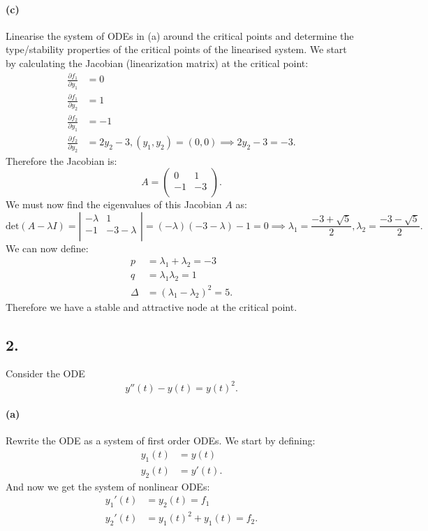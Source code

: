 \paragraph{(c)} Linearise the system of ODEs in (a) around the critical points and determine the type/stability properties of the critical points of the linearised system.
\bigbreak
We start by calculating the Jacobian (linearization matrix) at the critical point:
\begin{align*}
  \frac{\partial f_1}{\partial y_1} &= 0 \\
  \frac{\partial f_1}{\partial y_2} &= 1 \\
  \frac{\partial f_2}{\partial y_1} &= -1 \\
  \frac{\partial f_2}{\partial y_2} &= 2y_2 - 3, \left( y_1, y_2 \right) = \left( 0,0 \right) \implies 2y_2 - 3 = -3
.\end{align*}
Therefore the Jacobian is:
\[ 
A = \begin{pmatrix}
0 & 1\\
-1 & -3\\
\end{pmatrix}
.\]
We must now find the eigenvalues of this Jacobian $A$ as:
\[ 
\mathrm{det}(A - \lambda I) = \left| \begin{array}{cc}
-\lambda & 1\\
-1 & -3 - \lambda\\
\end{array} \right| = \left( -\lambda \right) \left( -3 -\lambda \right) - 1 = 0 \implies \lambda_1 = \frac{-3+\sqrt{5}}{2}, \lambda_2 = \frac{-3-\sqrt{5}}{2}
.\]
We can now define:
\begin{align*}
  p &= \lambda_1 + \lambda_2 = -3 \\
  q &= \lambda_1 \lambda_2 = 1\\
  \Delta &= \left( \lambda_1 - \lambda_2 \right)^2 = 5
.\end{align*}
Therefore we have a stable and attractive node at the critical point.




\subsection*{2.} Consider the ODE
\[ 
y''(t) - y(t) = y(t)^2
.\]

\paragraph{(a)} Rewrite the ODE as a system of first order ODEs.
\bigbreak
We start by defining:
\begin{align*}
  y_1(t) &= y(t) \\
  y_2(t) &= y'(t)
.\end{align*}
And now we get the system of nonlinear ODEs:
\begin{align*}
  y_1'(t) &= y_2(t) = f_1 \\
  y_2'(t) &= y_1(t)^2 + y_1(t) = f_2
.\end{align*}


